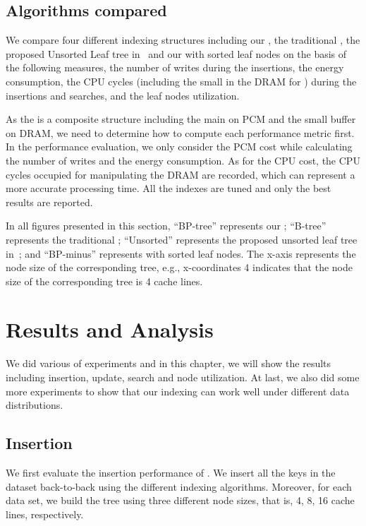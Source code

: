 \vspace{.5em}

\subsection{Algorithms compared}

We compare four different
indexing structures including our \bptree, the traditional
\bplustree, the proposed Unsorted Leaf tree
in~\cite{chen2011rethinking} and our \bptree with sorted leaf
nodes on the basis of the following measures, the number of writes during the insertions, the energy consumption,
the CPU cycles (including the small \bplustree in the DRAM for \bptree) during the insertions and searches, and the leaf nodes utilization.

As the \bptree is a composite structure including the main \bptree
on PCM and the small buffer \bplustree on DRAM, we need to
determine how to compute each performance metric first. In the
performance evaluation, we only consider the PCM cost while
calculating the number of writes and the energy consumption. As
for the CPU cost, the CPU cycles occupied for manipulating the
DRAM \bplustree are recorded, which can represent a more accurate
processing time. All the indexes are tuned and only the best results are reported.

In all figures presented in this section, ``BP-tree'' represents
our \bptree; ``B-tree'' represents the traditional \bplustree;
``Unsorted'' represents the proposed unsorted leaf tree
in~\cite{chen2011rethinking}; and ``BP-minus'' represents \bptree
with sorted leaf nodes. The x-axis represents the node size of the
corresponding tree, e.g., x-coordinates 4 indicates that the node
size of the corresponding tree is 4 cache lines.

\section{Results and Analysis}

We did various of experiments and in this chapter, we will show the results including insertion, update, search and node utilization.
At last, we also did some more experiments to show that our \bptree indexing can work well under different data distributions.

\subsection{Insertion}
We first evaluate the insertion performance of \bptree. We insert
all the keys in the dataset back-to-back using the different indexing algorithms. 
Moreover, for each data set, we build the tree using three different node sizes, that is, 4, 8, 16 cache lines, respectively.

